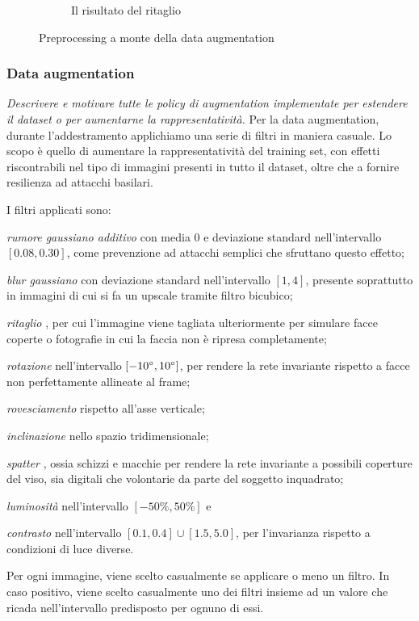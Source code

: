 \begin{figure}[H]
\begin{subfigure}{0.3\textwidth}
\caption{Il risultato del ritaglio}
\label{sfig:preprocessed}
\end{subfigure}
\caption{Preprocessing a monte della data augmentation}
\label{fig:preprocessing}
\end{figure}

\subsubsection{Data augmentation}
\emph{Descrivere e motivare tutte le policy di augmentation implementate per estendere il dataset o per aumentarne la rappresentatività.}
Per la data augmentation, durante l'addestramento applichiamo una serie di filtri in maniera casuale. Lo scopo è quello di aumentare la rappresentatività del training set, con effetti riscontrabili nel tipo di immagini presenti in tutto il dataset, oltre che a fornire resilienza ad attacchi basilari.

I filtri applicati sono:
\begin{enumerate*}[label={\alph*)}]
\item \emph{rumore gaussiano additivo} con media 0 e deviazione standard nell'intervallo $[0.08, 0.30]$, come prevenzione ad attacchi semplici che sfruttano questo effetto;
\item \emph{blur gaussiano} con deviazione standard nell'intervallo $[1, 4]$, presente soprattutto in immagini di cui si fa un upscale tramite filtro bicubico;
\item \emph{ritaglio} \cite{miviagender}, per cui l'immagine viene tagliata ulteriormente per simulare facce coperte o fotografie in cui la faccia non è ripresa completamente;
\item \emph{rotazione} nell'intervallo $[-10 \degree, 10 \degree ]$, per rendere la rete invariante rispetto a facce non perfettamente allineate al frame;
\item \emph{rovesciamento} rispetto all'asse verticale;
\item \emph{inclinazione} \cite{miviagender} nello spazio tridimensionale;
\item \emph{spatter} \cite{miviagender}, ossia schizzi e macchie per rendere la rete invariante a possibili coperture del viso, sia digitali che volontarie da parte del soggetto inquadrato;
\item \emph{luminosità} nell'intervallo $[-50\%, 50\%]$ e \item \emph{contrasto} nell'intervallo $[0.1, 0.4] \cup [1.5, 5.0]$, per l'invarianza rispetto a condizioni di luce diverse.
\end{enumerate*}
Per ogni immagine, viene scelto casualmente se applicare o meno un filtro. In caso positivo, viene scelto casualmente uno dei filtri insieme ad un valore che ricada nell'intervallo predisposto per ognuno di essi. 

